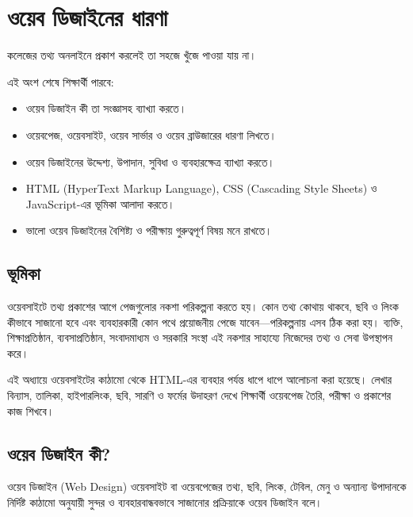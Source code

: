 \section{ওয়েব ডিজাইনের ধারণা}

কলেজের তথ্য অনলাইনে প্রকাশ করলেই তা সহজে খুঁজে পাওয়া যায় না।



\begin{learningbox}
এই অংশ শেষে শিক্ষার্থী পারবে:
\begin{itemize}
\item ওয়েব ডিজাইন কী তা সংজ্ঞাসহ ব্যাখ্যা করতে।
\item ওয়েবপেজ, ওয়েবসাইট, ওয়েব সার্ভার ও ওয়েব ব্রাউজারের ধারণা লিখতে।
\item ওয়েব ডিজাইনের উদ্দেশ্য, উপাদান, সুবিধা ও ব্যবহারক্ষেত্র ব্যাখ্যা করতে।
\item HTML (HyperText Markup Language), CSS (Cascading Style Sheets) ও JavaScript-এর ভূমিকা আলাদা করতে।
\item ভালো ওয়েব ডিজাইনের বৈশিষ্ট্য ও পরীক্ষায় গুরুত্বপূর্ণ বিষয় মনে রাখতে।
\end{itemize}
\end{learningbox}

\subsection{ভূমিকা}
ওয়েবসাইটে তথ্য প্রকাশের আগে পেজগুলোর নকশা পরিকল্পনা করতে হয়। কোন তথ্য কোথায় থাকবে, ছবি ও লিংক কীভাবে সাজানো হবে এবং ব্যবহারকারী কোন পথে প্রয়োজনীয় পেজে যাবেন—পরিকল্পনায় এসব ঠিক করা হয়। ব্যক্তি, শিক্ষাপ্রতিষ্ঠান, ব্যবসাপ্রতিষ্ঠান, সংবাদমাধ্যম ও সরকারি সংস্থা এই নকশার সাহায্যে নিজেদের তথ্য ও সেবা উপস্থাপন করে।

এই অধ্যায়ে ওয়েবসাইটের কাঠামো থেকে HTML-এর ব্যবহার পর্যন্ত ধাপে ধাপে আলোচনা করা হয়েছে। লেখার বিন্যাস, তালিকা, হাইপারলিংক, ছবি, সারণি ও ফর্মের উদাহরণ দেখে শিক্ষার্থী ওয়েবপেজ তৈরি, পরীক্ষা ও প্রকাশের কাজ শিখবে।

\subsection{ওয়েব ডিজাইন কী?}

\begin{definitionbox}{ওয়েব ডিজাইন (Web Design)}
ওয়েবসাইট বা ওয়েবপেজের তথ্য, ছবি, লিংক, টেবিল, মেনু ও অন্যান্য উপাদানকে নির্দিষ্ট কাঠামো অনুযায়ী সুন্দর ও ব্যবহারবান্ধবভাবে সাজানোর প্রক্রিয়াকে ওয়েব ডিজাইন বলে।
\end{definitionbox}

